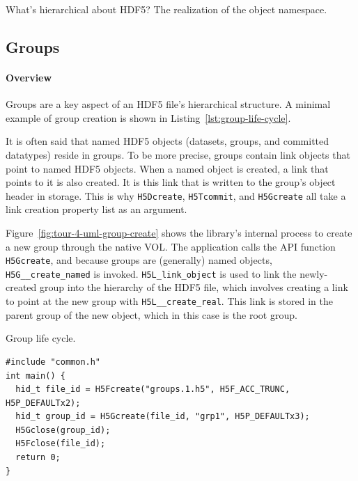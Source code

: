 


What's hierarchical about HDF5? The realization of the object namespace.

\subsection{Groups}

\paragraph{Overview} Groups are a key aspect of an HDF5 file's hierarchical structure. A minimal example of group creation is shown in Listing~\ref{lst:group-life-cycle}. 

It is often said that named HDF5 objects (datasets, groups, and committed datatypes) reside in groups. To be more precise, groups contain link objects that point to named HDF5 objects. When a named object is created, a link that points to it is also created. It is this link that is written to the group's object header in storage. This is why \texttt{H5Dcreate}, \texttt{H5Tcommit}, and \texttt{H5Gcreate} all take a link creation property list as an argument.

Figure~\ref{fig:tour-4-uml-group-create} shows the library's internal process to create a new group through the native VOL. The application calls the API function \texttt{H5Gcreate}, and because groups are (generally) named objects, \texttt{H5G\_\_create\_named} is invoked. \texttt{H5L\_link\_object} is used to link the newly-created group into the hierarchy of the HDF5 file, which involves creating a link to point at the new group with \texttt{H5L\_\_create\_real}. This link is stored in the parent group of the new object, which in this case is the root group.

\begin{listing}
\centering
\caption{Group life cycle.}
\label{lst:group-life-cycle}
\begin{verbatim}
#include "common.h"
int main() {
  hid_t file_id = H5Fcreate("groups.1.h5", H5F_ACC_TRUNC, H5P_DEFAULTx2);
  hid_t group_id = H5Gcreate(file_id, "grp1", H5P_DEFAULTx3);
  H5Gclose(group_id);
  H5Fclose(file_id);
  return 0;
}
\end{verbatim}
\end{listing}

